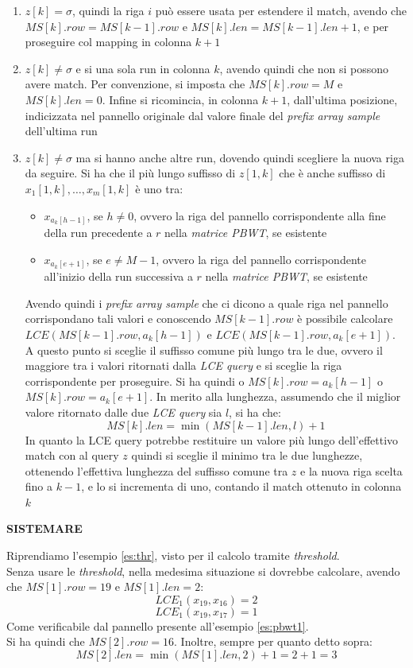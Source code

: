 \begin{enumerate}
  \item $z[k]=\sigma$, quindi la riga $i$ può essere usata per estendere il
  match, avendo che $MS[k].row=MS[k-1].row$ e $MS[k].len=MS[k-1].len+1$, e per
  proseguire col mapping in colonna $k+1$
  \item $z[k]\neq\sigma$ e si una sola run in colonna $k$, avendo quindi che non
  si possono avere match. Per convenzione, si
  imposta che $MS[k].row = M$ e $MS[k].len=0$. Infine si ricomincia, in colonna
  $k+1$, dall'ultima posizione, indicizzata nel pannello originale dal valore
  finale del \textit{prefix array sample} dell'ultima run
  \item $z[k]\neq\sigma$ ma si hanno anche altre run, dovendo quindi scegliere
  la nuova riga da seguire. Si ha che il più lungo suffisso di $z[1,k]$ che è
  anche suffisso di $x_1[1,k],\ldots, x_m[1,k]$ è uno tra:
  \begin{itemize}
    \item $x_{a_k[h-1]}$, se $h\neq 0$, ovvero la riga del pannello
    corrispondente alla fine della run precedente a $r$ nella \textit{matrice
      PBWT}, se esistente
    \item $x_{a_k[e+1]}$, se $e\neq M-1$, ovvero la riga del pannello
    corrispondente all'inizio della run successiva a $r$ nella \textit{matrice
      PBWT}, se esistente
  \end{itemize}
  Avendo quindi i \textit{prefix array sample} che ci dicono a quale riga nel
  pannello corrispondano tali valori e conoscendo $MS[k-1].row$ è possibile
  calcolare $LCE(MS[k-1].row, a_k[h-1])$ e $LCE(MS[k-1].row, a_k[e+1])$. A
  questo punto si sceglie il suffisso comune più lungo tra le due, ovvero il
  maggiore tra i valori ritornati dalla \textit{LCE query} e si sceglie la riga
  corrispondente per proseguire. Si ha quindi o $MS[k].row=a_k[h-1]$ o
  $MS[k].row=a_k[e+1]$. In merito alla lunghezza, assumendo che il miglior
  valore ritornato dalle due \textit{LCE query} sia $l$, si ha che:
  \[MS[k].len=\min(MS[k-1].len, l)+1\]
  In quanto la LCE query potrebbe restituire un valore più lungo dell'effettivo
  match con al query $z$ quindi si sceglie il minimo tra le due lunghezze,
  ottenendo l'effettiva lunghezza del suffisso comune tra $z$ e la nuova riga
  scelta fino a $k-1$, e lo si 
  incrementa di uno, contando il match ottenuto in colonna $k$
\end{enumerate}
\textbf{SISTEMARE}
\begin{esempio}
  Riprendiamo l'esempio \ref{es:thr}, visto per il calcolo
  tramite \textit{threshold}. \\
  Senza usare le \textit{threshold}, nella medesima situazione si dovrebbe
  calcolare, avendo che $MS[1].row=19$ e $MS[1].len =2$:
  \[LCE_1(x_{19}, x_{16})=2\]
  \[LCE_1(x_{19}, x_{17})=1\]
  Come verificabile dal pannello presente all'esempio \ref{es:pbwt1}.\\
  Si ha quindi che $MS[2].row=16$. Inoltre, sempre per quanto detto sopra:
  \[MS[2].len=\min(MS[1].len, 2)+1=2+1=3\]
\end{esempio}
